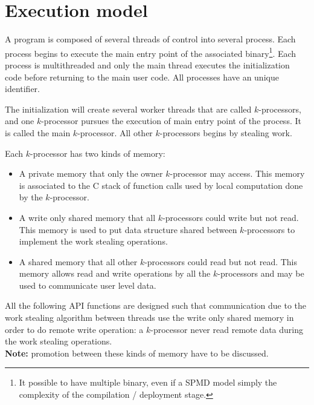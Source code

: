 \documentclass[12pt]{report}
\begin{document}
\section{Execution model}
A program is composed of several threads of control into several process. 
Each process begins to execute the main entry point of the associated binary\footnote{It possible to have multiple binary, even if a SPMD model simply the complexity of the compilation / deployment stage.}. Each process is multithreaded and only the main thread  executes the initialization code before returning to the main user code. All processes have an unique identifier.

The initialization will create several worker threads that are called $k$-processors, and one $k$-processor pursues  the execution of main entry point of the process. It is called the main $k$-processor. All other $k$-processors begins by stealing work.

Each $k$-processor has two kinds of memory:
\begin{itemize}
\item A private memory that only the owner $k$-processor may access. This memory is associated to the C stack of function calls used by local computation done by the $k$-processor.
\item A write only shared memory that all $k$-processors could write but not read. This memory is used to put data structure shared between $k$-processors to implement the work stealing operations.
\item A shared memory that all other $k$-processors could read but not read. This memory allows read and write operations by all the $k$-processors and may be used to communicate user level data.
\end{itemize}
All the following API functions are designed such that communication due to the work stealing algorithm between threads use the write only shared memory in order to do remote write operation: a $k$-processor never read remote data during the work stealing operations.\\

\noindent\textbf{Note:} promotion between these kinds of memory have to be discussed.\\
\end{document}

